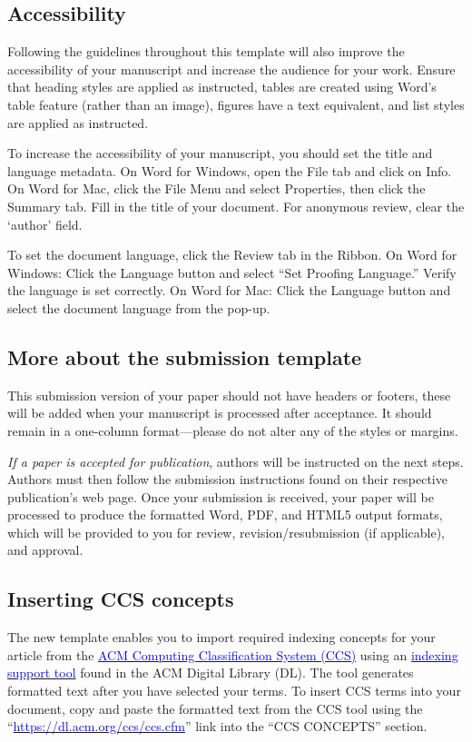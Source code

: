 \documentclass[conference]{IEEEtran}
\begin{document}
\subsection{Accessibility}

Following the guidelines throughout this template will also improve the accessibility of your manuscript and increase the audience for your work.  Ensure that heading styles are applied as instructed, tables are created using Word’s table feature (rather than an image), figures have a text equivalent, and list styles are applied as instructed.

To increase the accessibility of your manuscript, you should set the title and language metadata. On Word for Windows, open the File tab and click on Info. On Word for Mac, click the File Menu and select Properties, then click the Summary tab. Fill in the title of your document. For anonymous review, clear the ‘author’ field.

To set the document language, click the Review tab in the Ribbon. On Word for Windows: Click the Language button and select “Set Proofing Language.” Verify the language is set correctly. On Word for Mac: Click the Language button and select the document language from the pop-up.

\subsection{More about the submission template}

This\textbf{ }submission version of your paper should not have headers or footers, these will be added when your manuscript is processed after acceptance. It should remain in a one-column format—please do not alter any of the styles or margins.

\textit{If a paper is accepted for publication}, authors will be instructed on the next steps. Authors must then follow the submission instructions found on their respective publication’s web page. Once your submission is received, your paper will be processed to produce the formatted Word, PDF, and HTML5 output formats, which will be provided to you for review, revision/resubmission (if applicable), and approval. 

\subsection{Inserting CCS concepts}

The new template enables you to import required indexing concepts for your article from the \href{http://www.acm.org/publications/class-2012}{\textcolor{blue}{ACM Computing Classification System (CCS)}} using an \href{http://dl.acm.org/ccs/ccs.cfm?}{\textcolor{blue}{indexing support tool}} found in the ACM Digital Library (DL). The tool generates formatted text after you have selected your terms. To insert CCS terms into your document, copy and paste the formatted text from the CCS tool using the “\href{https://dl.acm.org/ccs/ccs.cfm}{\textcolor{blue}{https://dl.acm.org/ccs/ccs.cfm}}” link into the “CCS CONCEPTS” section. 
\end{document}
